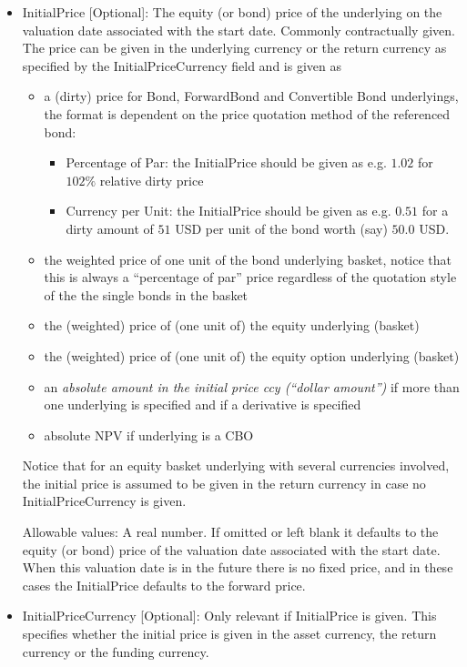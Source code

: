 \begin{itemize}
\begin{itemize}
  \item InitialPrice [Optional]: The equity (or bond) price of the underlying
    on the valuation date associated with the start date. Commonly contractually given. The price can be given in the
    underlying currency or the return currency as specified by the InitialPriceCurrency field and is given as
    \begin{itemize}
    \item a (dirty) price for Bond, ForwardBond and Convertible Bond underlyings, the format is dependent on the price quotation method of the referenced bond:
      \begin{itemize}
      \item Percentage of Par: the InitialPrice should be given as e.g. $1.02$ for $102\%$ relative dirty price
      \item Currency per Unit: the InitialPrice should be given as e.g. $0.51$ for a dirty amount of $51$ USD per unit
        of the bond worth (say) $50.0$ USD.
      \end{itemize}
      \item the weighted price of one unit of the bond underlying basket, notice that this is always a ``percentage of
        par'' price regardless of the quotation style of the the single bonds in the basket
      \item the (weighted) price of (one unit of) the equity underlying (basket)
      \item the (weighted) price of (one unit of) the equity option underlying (basket)
      \item an {\em absolute amount in the initial price ccy (``dollar amount'')} if more than one underlying is
        specified and if a derivative is specified
      \item absolute NPV if underlying is a CBO
    \end{itemize}
    Notice that for an equity basket underlying with several currencies involved, the initial price is assumed to be given in the
    return currency in case no InitialPriceCurrency is given.

    Allowable values: A real number. If omitted or left blank it defaults to the equity (or bond) price of the valuation
    date associated with the start date. When this valuation date is in the future there is no fixed price, 
    and in these cases the InitialPrice defaults to the forward price.
    
  \item InitialPriceCurrency [Optional]: Only relevant if InitialPrice is given. This specifies whether the initial
    price is given in the asset currency, the return currency or the funding currency.
    

\end{itemize}
\end{itemize}
